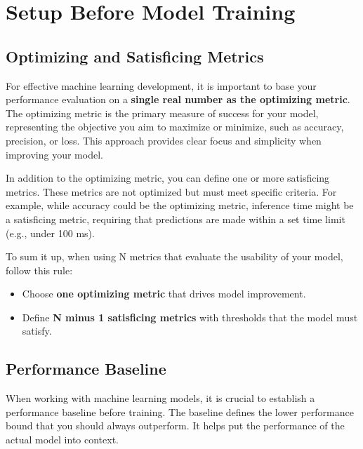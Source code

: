 \documentclass[12pt,openany]{book}
\begin{document}
\chapter{Setup Before Model Training}



\section{Optimizing and Satisficing Metrics}

For effective machine learning development, it is important to base your performance evaluation on a \textbf{single real number as the optimizing metric}. The optimizing metric is the primary measure of success for your model, representing the objective you aim to maximize or minimize, such as accuracy, precision, or loss. This approach provides clear focus and simplicity when improving your model. \newline

In addition to the optimizing metric, you can define one or more satisficing metrics. These metrics are not optimized but must meet specific criteria. For example, while accuracy could be the optimizing metric, inference time might be a satisficing metric, requiring that predictions are made within a set time limit (e.g., under 100 ms). \newline \newline

To sum it up, when using N metrics that evaluate the usability of your model, follow this rule:
\begin{itemize}
    \item Choose \textbf{one optimizing metric} that drives model improvement.
    \item Define \textbf{N minus 1 satisficing metrics} with thresholds that the model must satisfy.
\end{itemize}



\section{Performance Baseline} \label{sec:performance_baseline}

When working with machine learning models, it is crucial to establish a performance baseline before training. The baseline defines the lower performance bound that you should always outperform. It helps put the performance of the actual model into context. \newline
\end{document}
